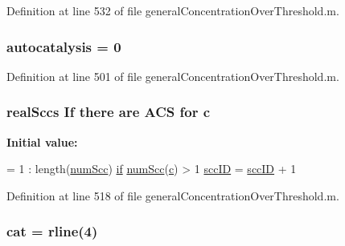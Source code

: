 Definition at line 532 of file general\+Concentration\+Over\+Threshold.\+m.

\hypertarget{a00028_a2d0b5f62c8a18e8cbfeb15c6f8856c5a}{
\subsubsection[{autocatalysis}]{\setlength{\rightskip}{0pt plus 5cm}autocatalysis = 0}}\label{a00028_a2d0b5f62c8a18e8cbfeb15c6f8856c5a}


Definition at line 501 of file general\+Concentration\+Over\+Threshold.\+m.

\hypertarget{a00028_a0f16b7d4c8c225e06e6a8b2081508e64}{
\subsubsection[{c}]{ {\bf real\+Sccs} If there are {\bf A\+C\+S} for c}}\label{a00028_a0f16b7d4c8c225e06e6a8b2081508e64}
{\bfseries Initial value\+:}
\begin{DoxyCode}
= 1 : length(\hyperlink{a00028_a0d0db21d4520f7561ff56e2c80e4fb69}{numScc})
                \hyperlink{a00028_a69389e83631699e80408490e48a695b0}{if} \hyperlink{a00028_a0d0db21d4520f7561ff56e2c80e4fb69}{numScc}(\hyperlink{a00028_a0f16b7d4c8c225e06e6a8b2081508e64}{c}) > 1
                    \hyperlink{a00028_a85ff953f350ff6660d5f3489e31d57b6}{sccID} = \hyperlink{a00028_a85ff953f350ff6660d5f3489e31d57b6}{sccID} + 1
\end{DoxyCode}


Definition at line 518 of file general\+Concentration\+Over\+Threshold.\+m.

\hypertarget{a00028_a7073f71a43389f3032e69b1fffc2551a}{
\subsubsection[{cat}]{\setlength{\rightskip}{0pt plus 5cm}cat = {\bf rline}(4)}}\label{a00028_a7073f71a43389f3032e69b1fffc2551a}


